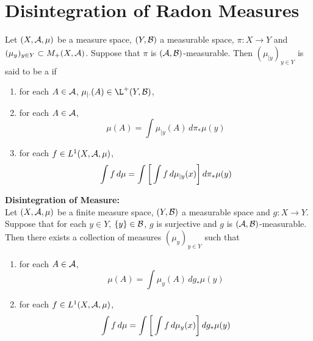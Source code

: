 \documentclass{book}
\begin{document}
\newpage
\section{Disintegration of Radon Measures}

  

\begin{defn}
	Let $(X, \mathcal{A}, \mu)$ be a measure space, $(Y, \mathcal{B})$ a measurable space, $\pi: X \rightarrow Y$ and $(\mu_y)_{y \in Y} \subset M_+(X, \mathcal{A})$. Suppose that $\pi$ is $(\mathcal{A}, \mathcal{B})$-measurable. Then $(\mu_{|y})_{y \in Y}$ is said to be a  if 
	\begin{enumerate}
		\item for each $A \in \mathcal{A}$, $\mu_{| \cdot}(A) \in \L^+(Y, \MB)$,
		\item for each $A \in \mathcal{A}$, 
		$$\mu(A) = \int \mu_{|y}(A) \, d \pi_*\mu(y) $$
		\item for each $f \in L^1(X, \mathcal{A}, \mu)$, 
		$$\int f \, d \mu = \int \bigg[ \int f \, d\mu_{|y}(x) \bigg] \, d \pi_*\mu(y)$$ 
	\end{enumerate}
\end{defn}

\begin{ex} \textbf{Disintegration of Measure:} \\
	Let $(X, \mathcal{A}, \mu)$ be a finite measure space, $(Y, \mathcal{B})$ a measurable space and $g: X \rightarrow Y$. Suppose that for each $y \in Y$, $\{y\} \in \mathcal{B}$, $g$ is surjective and $g$ is $(\mathcal{A}, \mathcal{B})$-measurable. Then there exists a collection of measures $(\mu_y)_{y \in Y}$ such that  
	\begin{enumerate}
		\item for each $A \in \mathcal{A}$, 
		$$\mu(A) = \int \mu_y(A) \, d g_*\mu(y) $$
		\item for each $f \in L^1(X, \mathcal{A}, \mu)$, 
		$$\int f \, d \mu = \int \bigg[ \int f \, d\mu_y(x) \bigg] \, d g_*\mu(y)$$ 
	\end{enumerate}
\end{ex}
\end{document}
